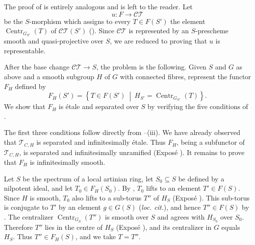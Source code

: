 
The proof of  is entirely analogous and is left
to the reader. Let
\[
  u:F\longrightarrow\mathcal{CT}
\]
be the \(S\)-morphism which assigns to every
\(T\in F(S')\) the element
\(\operatorname{Centr}_{G_{S'}}(T)\) of
\(\mathcal{CT}(S')\) (). Since \(\mathcal{CT}\) is represented
by an \(S\)-prescheme smooth and quasi-projective over \(S\), we
are reduced to proving that \(u\) is representable.

After the base change \(\mathcal{CT}\to S\), the problem is the
following. Given \(S\) and \(G\) as above and a smooth subgroup
\(H\) of \(G\) with connected fibres, represent the functor \(F_H\)
defined by
\[
  F_H(S')=
  \left\{T\in F(S')\ \middle|\
  H_{S'}=\operatorname{Centr}_{G_{S'}}(T)\right\}.
\]
We show that \(F_H\) is étale and separated over \(S\) by verifying
the five conditions of \SGARefLink{sga3:xv:lemma:8-10}{Lemma 8.10}.

The first three conditions follow directly from
--(iii). We have already observed that
\(\mathcal T_{C,H}\) is separated and infinitesimally étale.
Thus \(F_H\), being a subfunctor of \(\mathcal T_{C,H}\), is
separated and infinitesimally unramified (Exposé ). It remains
to prove that \(F_H\) is infinitesimally smooth.

Let \(S\) be the spectrum of a local artinian ring, let
\(S_0\subseteq S\) be defined by a nilpotent ideal, and let
\(T_0\in F_H(S_0)\). By , \(T_0\) lifts to an
element \(T'\in F(S)\). Since \(H\) is smooth, \(T_0\) also lifts
to a sub-torus \(T''\) of \(H_S\) (Exposé ). This
sub-torus is conjugate to \(T'\) by an element \(g\in G(S)\)
(\emph{loc. cit.}), and hence \(T''\in F(S)\) by
. The centralizer
\(\operatorname{Centr}_{G_S}(T'')\) is smooth over \(S\) and agrees
with \(H_{S_0}\) over \(S_0\). Therefore \(T''\) lies in the centre
of \(H_S\) (Exposé ), and its centralizer in \(G\) equals
\(H_S\). Thus \(T''\in F_H(S)\), and we take \(T=T''\).

